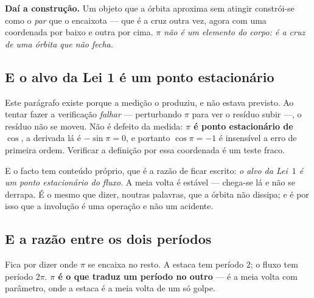 \documentclass[livro.tex]{subfiles}
\begin{document}
\noindent \textbf{Daí a construção.} Um objeto que a órbita aproxima sem atingir constrói-se como
o \emph{par} que o encaixota --- que é a cruz outra vez, agora com uma coordenada por baixo e
outra por cima. \emph{$\pi$ não é um elemento do corpo: é a cruz de uma órbita que não fecha.}


\subsection{E o alvo da Lei 1 é um ponto estacionário}\label{sec:piestacionario}

\noindent Este parágrafo existe porque a medição o produziu, e não estava previsto. Ao tentar
fazer a verificação \emph{falhar} --- perturbando $\pi$ para ver o resíduo subir ---, o resíduo
não se moveu. Não é defeito da medida: \textbf{$\pi$ é ponto estacionário de $\cos$}, a derivada
lá é $-\sin\pi = 0$, e portanto $\cos\pi = -1$ é insensível a erro de primeira ordem. Verificar a
definição por essa coordenada é um teste fraco.

\medskip
\noindent E o facto tem conteúdo próprio, que é a razão de ficar escrito: \emph{o alvo da Lei~$1$
é um ponto estacionário do fluxo}. A meia volta é estável --- chega-se lá e não se derrapa. É o
mesmo que dizer, noutras palavras, que a órbita não dissipa; e é por isso que a involução é uma
operação e não um acidente.


\subsection{E a razão entre os dois períodos}\label{sec:piperiodo}

\noindent Fica por dizer onde $\pi$ se encaixa no resto. A estaca tem período $2$; o fluxo tem
período $2\pi$. \textbf{$\pi$ é o que traduz um período no outro} --- é a meia volta com
parâmetro, onde a estaca é a meia volta de um só golpe.
\end{document}
